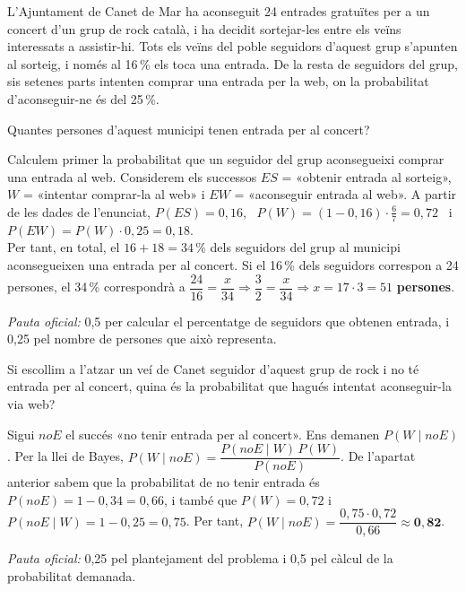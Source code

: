 L'Ajuntament de Canet de Mar ha aconseguit 24 entrades gratuïtes per a un concert d'un grup
de rock català, i ha decidit sortejar-les entre els veïns interessats a assistir-hi. Tots els
veïns del poble seguidors d'aquest grup s'apunten al sorteig, i només al 16\,\% els toca una
entrada. De la resta de seguidors del grup, sis setenes parts intenten comprar una entrada
per la web, on la probabilitat d'aconseguir-ne és del 25\,\%.

\begin{apartats}

Quantes persones d'aquest municipi tenen entrada per al concert?

\begin{solucio}
Calculem primer la probabilitat que un seguidor del grup aconsegueixi comprar una entrada al
web. Considerem els successos $ES$ = «obtenir entrada al sorteig», $W$ = «intentar
comprar-la al web» i $EW$ = «aconseguir entrada al web». A partir de les dades de
l'enunciat, $P(ES)=0{,}16$, \ $P(W)=(1-0{,}16)\cdot\frac67=0{,}72$ \ i
$P(EW)=P(W)\cdot0{,}25=0{,}18$.\\
Per tant, en total, el $16+18=34\,\%$ dels seguidors del grup al municipi aconsegueixen una
entrada per al concert. Si el 16\,\% dels seguidors correspon a 24 persones, el 34\,\%
correspondrà a
$\dfrac{24}{16}=\dfrac{x}{34}\Rightarrow\dfrac32=\dfrac{x}{34}\Rightarrow x=17\cdot3=51$
\textbf{persones}.

\textit{Pauta oficial:} 0,5 per calcular el percentatge de seguidors que obtenen entrada, i
0,25 pel nombre de persones que això representa.
\end{solucio}

Si escollim a l'atzar un veí de Canet seguidor d'aquest grup de rock i no té entrada per al
concert, quina és la probabilitat que hagués intentat aconseguir-la via web?

\begin{solucio}
Sigui $noE$ el succés «no tenir entrada per al concert». Ens demanen $P(W\mid noE)$. Per la
llei de Bayes,
$P(W\mid noE)=\dfrac{P(noE\mid W)\,P(W)}{P(noE)}$.
De l'apartat anterior sabem que la probabilitat de no tenir entrada és
$P(noE)=1-0{,}34=0{,}66$, i també que $P(W)=0{,}72$ i
$P(noE\mid W)=1-0{,}25=0{,}75$. Per tant,
$P(W\mid noE)=\dfrac{0{,}75\cdot0{,}72}{0{,}66}\approx\mathbf{0{,}82}$.

\textit{Pauta oficial:} 0,25 pel plantejament del problema i 0,5 pel càlcul de la
probabilitat demanada.
\end{solucio}


\end{apartats}

